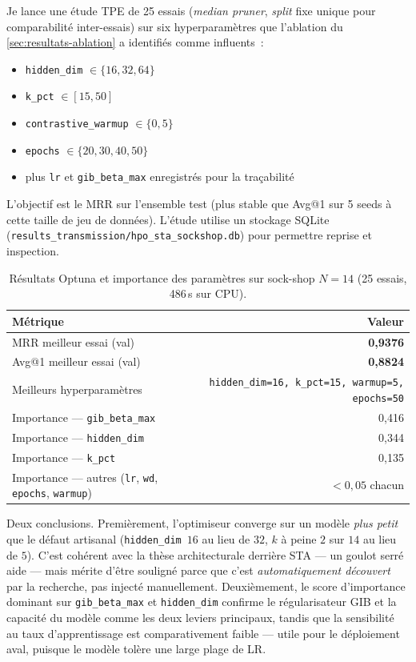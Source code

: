 \documentclass[a4paper,11pt,oneside]{report}
\begin{document}
Je lance une \'etude TPE de 25 essais (\emph{median pruner}, \emph{split} fixe unique pour comparabilit\'e inter-essais) sur six hyperparam\`etres que l'ablation du \cref{sec:resultats-ablation} a identifi\'es comme influents~:
\begin{itemize}
  \item \texttt{hidden\_dim} $\in \{16, 32, 64\}$
  \item \texttt{k\_pct} $\in [15, 50]$
  \item \texttt{contrastive\_warmup} $\in \{0, 5\}$
  \item \texttt{epochs} $\in \{20, 30, 40, 50\}$
  \item plus \texttt{lr} et \texttt{gib\_beta\_max} enregistr\'es pour la tra\c{c}abilit\'e
\end{itemize}

L'objectif est le MRR sur l'ensemble test (plus stable que Avg@1 sur 5 seeds \`a cette taille de jeu de donn\'ees). L'\'etude utilise un stockage SQLite (\texttt{results\_transmission/hpo\_sta\_sockshop.db}) pour permettre reprise et inspection.

\begin{table}[ht]
\centering
\caption{R\'esultats Optuna et importance des param\`etres sur sock-shop $N{=}14$ (25 essais, 486\,s sur CPU).}
\label{tab:hpo-results}
\begin{tabular}{lr}
\toprule
M\'etrique & Valeur \\
\midrule
MRR meilleur essai (val) & \textbf{0{,}9376} \\
Avg@1 meilleur essai (val) & \textbf{0{,}8824} \\
Meilleurs hyperparam\`etres & \texttt{hidden\_dim=16, k\_pct=15, warmup=5, epochs=50} \\
\midrule
Importance --- \texttt{gib\_beta\_max} & 0{,}416 \\
Importance --- \texttt{hidden\_dim} & 0{,}344 \\
Importance --- \texttt{k\_pct} & 0{,}135 \\
Importance --- autres (\texttt{lr}, \texttt{wd}, \texttt{epochs}, \texttt{warmup}) & $< 0{,}05$ chacun \\
\bottomrule
\end{tabular}
\end{table}

Deux conclusions. Premi\`erement, l'optimiseur converge sur un mod\`ele \emph{plus petit} que le d\'efaut artisanal (\texttt{hidden\_dim}~$16$ au lieu de $32$, $k$ \`a peine $2$ sur $14$ au lieu de $5$). C'est coh\'erent avec la th\`ese architecturale derri\`ere STA --- un goulot serr\'e aide --- mais m\'erite d'\^etre soulign\'e parce que c'est \emph{automatiquement d\'ecouvert} par la recherche, pas inject\'e manuellement. Deuxi\`emement, le score d'importance dominant sur \texttt{gib\_beta\_max} et \texttt{hidden\_dim} confirme le r\'egularisateur GIB et la capacit\'e du mod\`ele comme les deux leviers principaux, tandis que la sensibilit\'e au taux d'apprentissage est comparativement faible --- utile pour le d\'eploiement aval, puisque le mod\`ele tol\`ere une large plage de LR.
\end{document}
